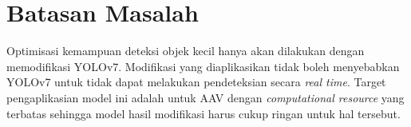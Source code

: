 \section{Batasan Masalah}
    Optimisasi kemampuan deteksi objek kecil hanya akan dilakukan dengan memodifikasi YOLOv7.
    Modifikasi yang diaplikasikan tidak boleh menyebabkan YOLOv7 untuk tidak dapat melakukan pendeteksian secara \emph{real time}.
    Target pengaplikasian model ini adalah untuk AAV dengan \emph{computational resource} yang terbatas sehingga model hasil modifikasi harus cukup ringan untuk hal tersebut.
